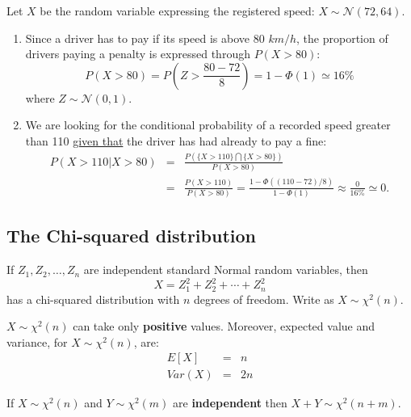 \documentclass[smaller]{beamer}\usepackage[]{graphicx}\usepackage[]{color}
\begin{document}
\begin{frame}{\subsecname}
  \begin{example}[continued]
  Let $X$ be the random variable expressing the registered speed: $X \sim \mathcal{N}(72,64)$.
    \begin{enumerate}
    \item Since a driver has to pay if its speed is above  $80$ $km/h$, the proportion of drivers paying a penalty is expressed  through $P(X>80)$:
    \begin{equation*}
    P(X>80)= P\left(Z>\frac{80-72}{8} \right)=1-\Phi(1) \simeq 16 \%
    \end{equation*}
    where $Z \sim \mathcal{N}(0,1)$.
    \item We are looking for the conditional probability of a recorded speed greater than 110 \underline{given that} the driver has had already to pay a fine:
    \begin{eqnarray*}
    P(X>110 \vert X>80) &=&  \frac{P(\{X>110\} \bigcap \{X>80\})}{P(X>80)} \\
    &=& \frac{P(X>110)}{P(X>80)} = \frac{1- \Phi((110-72)/8)}{1-\Phi(1)}\approx \frac{0}{16\%}\simeq 0.
    \end{eqnarray*}
    \end{enumerate}
  \end{example}
\end{frame}


\subsection{The Chi-squared distribution}

\begin{frame}{\subsecname}
  \begin{definition}
  If $Z_{1},Z_{2},\ldots ,Z_{n}$ are independent standard Normal random
  variables, then%
  \begin{equation*}
  X=Z_{1}^{2}+Z_{2}^{2}+\cdots +Z_{n}^{2}
  \end{equation*}%
  has a chi-squared distribution with $n$ degrees of freedom. Write as $X\sim \chi ^{2}(n)$.
  \end{definition}

  $X\sim \chi ^{2}(n)$ can take only \textbf{positive }values. Moreover, expected value and variance, for $X\sim \chi ^{2}(n)$, are:
  \begin{eqnarray*}
  E\left[ X\right] &=&n \\
  Var\left( X\right) &=&2n
  \end{eqnarray*}

  If $X\sim \chi ^{2}(n)$ and $Y\sim \chi ^{2}(m)$ are \textbf{%
  independent} then $X+Y\sim \chi ^{2}(n+m)$.
\end{frame}
\end{document}
